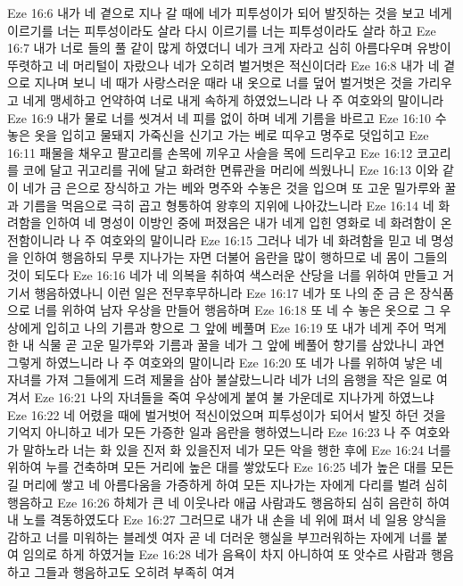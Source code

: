 Eze 16:6  내가 네 곁으로 지나 갈 때에 네가 피투성이가 되어 발짓하는 것을 보고 네게 이르기를 너는 피투성이라도 살라 다시 이르기를 너는 피투성이라도 살라 하고
Eze 16:7  내가 너로 들의 풀 같이 많게 하였더니 네가 크게 자라고 심히 아름다우며 유방이 뚜렷하고 네 머리털이 자랐으나 네가 오히려 벌거벗은 적신이더라
Eze 16:8  내가 네 곁으로 지나며 보니 네 때가 사랑스러운 때라 내 옷으로 너를 덮어 벌거벗은 것을 가리우고 네게 맹세하고 언약하여 너로 내게 속하게 하였었느니라 나 주 여호와의 말이니라
Eze 16:9  내가 물로 너를 씻겨서 네 피를 없이 하며 네게 기름을 바르고
Eze 16:10  수 놓은 옷을 입히고 물돼지 가죽신을 신기고 가는 베로 띠우고 명주로 덧입히고
Eze 16:11  패물을 채우고 팔고리를 손목에 끼우고 사슬을 목에 드리우고
Eze 16:12  코고리를 코에 달고 귀고리를 귀에 달고 화려한 면류관을 머리에 씌웠나니
Eze 16:13  이와 같이 네가 금 은으로 장식하고 가는 베와 명주와 수놓은 것을 입으며 또 고운 밀가루와 꿀과 기름을 먹음으로 극히 곱고 형통하여 왕후의 지위에 나아갔느니라
Eze 16:14  네 화려함을 인하여 네 명성이 이방인 중에 퍼졌음은 내가 네게 입힌 영화로 네 화려함이 온전함이니라 나 주 여호와의 말이니라
Eze 16:15  그러나 네가 네 화려함을 믿고 네 명성을 인하여 행음하되 무릇 지나가는 자면 더불어 음란을 많이 행하므로 네 몸이 그들의 것이 되도다
Eze 16:16  네가 네 의복을 취하여 색스러운 산당을 너를 위하여 만들고 거기서 행음하였나니 이런 일은 전무후무하니라
Eze 16:17  네가 또 나의 준 금 은 장식품으로 너를 위하여 남자 우상을 만들어 행음하며
Eze 16:18  또 네 수 놓은 옷으로 그 우상에게 입히고 나의 기름과 향으로 그 앞에 베풀며
Eze 16:19  또 내가 네게 주어 먹게 한 내 식물 곧 고운 밀가루와 기름과 꿀을 네가 그 앞에 베풀어 향기를 삼았나니 과연 그렇게 하였느니라 나 주 여호와의 말이니라
Eze 16:20  또 네가 나를 위하여 낳은 네 자녀를 가져 그들에게 드려 제물을 삼아 불살랐느니라 네가 너의 음행을 작은 일로 여겨서
Eze 16:21  나의 자녀들을 죽여 우상에게 붙여 불 가운데로 지나가게 하였느냐
Eze 16:22  네 어렸을 때에 벌거벗어 적신이었으며 피투성이가 되어서 발짓 하던 것을 기억지 아니하고 네가 모든 가증한 일과 음란을 행하였느니라
Eze 16:23  나 주 여호와가 말하노라 너는 화 있을 진저 화 있을진저 네가 모든 악을 행한 후에
Eze 16:24  너를 위하여 누를 건축하며 모든 거리에 높은 대를 쌓았도다
Eze 16:25  네가 높은 대를 모든 길 머리에 쌓고 네 아름다움을 가증하게 하여 모든 지나가는 자에게 다리를 벌려 심히 행음하고
Eze 16:26  하체가 큰 네 이웃나라 애굽 사람과도 행음하되 심히 음란히 하여 내 노를 격동하였도다
Eze 16:27  그러므로 내가 내 손을 네 위에 펴서 네 일용 양식을 감하고 너를 미워하는 블레셋 여자 곧 네 더러운 행실을 부끄러워하는 자에게 너를 붙여 임의로 하게 하였거늘
Eze 16:28  네가 음욕이 차지 아니하여 또 앗수르 사람과 행음하고 그들과 행음하고도 오히려 부족히 여겨
